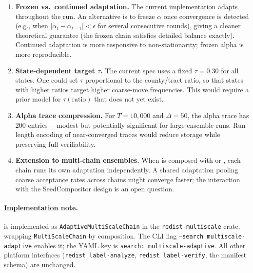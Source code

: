 \begin{enumerate}
  \item \textbf{Frozen vs.\ continued adaptation.}
    The current implementation adapts throughout the run.
    An alternative is to freeze $\alpha$ once convergence is detected
    (e.g., when $|\alpha_t - \alpha_{t-1}| < \epsilon$ for several consecutive
    rounds), giving a cleaner theoretical guarantee (the frozen chain
    satisfies detailed balance exactly).
    Continued adaptation is more responsive to non-stationarity; frozen
    alpha is more reproducible.

  \item \textbf{State-dependent target $\tau$.}
    The current spec uses a fixed $\tau = 0.30$ for all states.
    One could set $\tau$ proportional to the county/tract ratio, so that
    states with higher ratios target higher coarse-move frequencies.
    This would require a prior model for $\tau(\text{ratio})$ that does not
    yet exist.

  \item \textbf{Alpha trace compression.}
    For $T = 10{,}000$ and $\Delta = 50$, the alpha trace has 200 entries---
    modest but potentially significant for large ensemble runs.
    Run-length encoding of near-converged traces would reduce storage while
    preserving full verifiability.

  \item \textbf{Extension to multi-chain ensembles.}
    When \ams{} is composed with \cs{} or \be{}, each chain runs its own
    adaptation independently.
    A shared adaptation pooling coarse acceptance rates across chains might
    converge faster; the interaction with the SeedCompositor design is an
    open question.
\end{enumerate}

\paragraph{Implementation note.}
\ams{} is implemented as \texttt{AdaptiveMultiScaleChain} in the
\texttt{redist-multiscale} crate, wrapping \texttt{MultiScaleChain} by
composition.
The CLI flag \texttt{--search multiscale-adaptive} enables it; the YAML
key is \texttt{search: multiscale-adaptive}.
All other platform interfaces (\texttt{redist label-analyze},
\texttt{redist label-verify}, the manifest schema) are unchanged.
